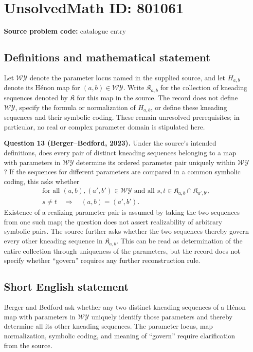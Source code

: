 \documentclass[11pt]{article}
\begin{document}
\section*{UnsolvedMath ID: 801061}
\textbf{Source problem code:} catalogue entry
\subsection{Definitions and mathematical statement}
Let \(\mathcal{WY}\) denote the parameter locus named in the supplied source, and let \(H_{a,b}\) denote its H\'enon map for \((a,b)\in\mathcal{WY}\). Write \(\mathfrak K_{a,b}\) for the collection of kneading sequences denoted by \(\mathfrak K\) for this map in the source. The record does not define \(\mathcal{WY}\), specify the formula or normalization of \(H_{a,b}\), or define these kneading sequences and their symbolic coding. These remain unresolved prerequisites; in particular, no real or complex parameter domain is stipulated here.

\textbf{Question 13 (Berger--Bedford, 2023).} Under the source's intended definitions, does every pair of distinct kneading sequences belonging to a map with parameters in \(\mathcal{WY}\) determine its ordered parameter pair uniquely within \(\mathcal{WY}\)? If the sequences for different parameters are compared in a common symbolic coding, this asks whether
\[
\begin{gathered}
\text{for all }(a,b),(a',b')\in\mathcal{WY}
\text{ and all }s,t\in\mathfrak K_{a,b}\cap\mathfrak K_{a',b'},\\
s\ne t\quad\Longrightarrow\quad(a,b)=(a',b').
\end{gathered}
\]
Existence of a realizing parameter pair is assumed by taking the two sequences from one such map; the question does not assert realizability of arbitrary symbolic pairs. The source further asks whether the two sequences thereby govern every other kneading sequence in \(\mathfrak K_{a,b}\). This can be read as determination of the entire collection through uniqueness of the parameters, but the record does not specify whether ``govern'' requires any further reconstruction rule.
\subsection{Short English statement}
Berger and Bedford ask whether any two distinct kneading sequences of a H\'enon map with parameters in \(\mathcal{WY}\) uniquely identify those parameters and thereby determine all its other kneading sequences. The parameter locus, map normalization, symbolic coding, and meaning of ``govern'' require clarification from the source.
\end{document}
